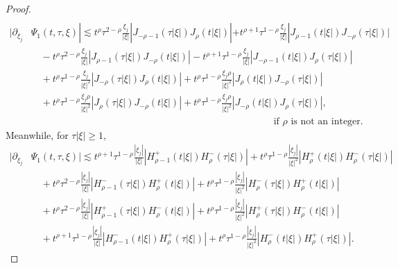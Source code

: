 \documentclass[11pt,twoside]{article}
\newcommand{\f}{\frac}
\theoremstyle{plain}
\theoremstyle{definition}
\theoremstyle{remark}
\numberwithin{equation}{section}
\begin{document}
\begin{proof}
\begin{equation}
\begin{aligned}
\end{aligned}
\end{equation}
\begin{equation}\label{l18}
\begin{aligned}
|\partial_{\xi_j}&\Psi_1(t, \tau, \xi)|
\lesssim t^\rho \tau^{2-\rho}\frac{\xi_j}{|\xi|} |J_{-\rho-1}(\tau|\xi|) J_\rho(t|\xi|)|+t^{\rho+1} \tau^{1-\rho}\frac{\xi_j}{|\xi|} |J_{\rho-1}(t|\xi|) J_{-\rho}(\tau|\xi|)| \\
&\quad -t^\rho \tau^{2-\rho}\frac{\xi_j}{|\xi|} |J_{\rho-1}(\tau|\xi|) J_{-\rho}(t|\xi|)|
-t^{\rho+1} \tau^{1-\rho}\frac{\xi_j}{|\xi|} |J_{-\rho-1}(t|\xi|) J_\rho(\tau|\xi|)|\\
& \quad+t^\rho \tau^{1-\rho}\frac{\xi_j}{|\xi|^2} |J_{-\rho}(\tau|\xi|) J_\rho(t|\xi|)| +t^\rho \tau^{1-\rho}\frac{\xi_j\rho}{|\xi|^2} |J_\rho(t|\xi|) J_{-\rho}(\tau|\xi|)|\\
&\quad +t^\rho \tau^{1-\rho}\frac{\xi_j\rho}{|\xi|^2} |J_\rho(\tau|\xi|) J_{-\rho}(t|\xi|)|+t^\rho \tau^{1-\rho}\frac{\xi_j\rho}{|\xi|^2} |J_{-\rho}(t|\xi|) J_\rho(\tau|\xi|)|,\\&\qquad\qquad\qquad\qquad\qquad\qquad\qquad\qquad\qquad\qquad\qquad\qquad\quad\text{if $\rho$ is not an integer.}
\end{aligned}
\end{equation}
Meanwhile, for $\tau|\xi|\geq 1$,
\begin{equation}\label{l19}
\begin{aligned}
|\partial_{\xi_j}&\Psi_1(t, \tau, \xi)|
\lesssim  t^{\rho+1}\tau^{1-\rho} \f{|\xi_j|}{|\xi|} \left| H_{\rho-1}^+(t|\xi|) H_{\rho}^-(\tau|\xi|) \right|
+ t^\rho\tau^{1-\rho} \frac{|\xi_j|}{|\xi|^2} \left| H_\rho^+(t|\xi|) H_{\rho}^-(\tau|\xi|) \right| \\
&\quad + t^\rho\tau^{2-\rho} \f{|\xi_j|}{|\xi|} \left| H_{\rho-1}^-(\tau|\xi|) H_\rho^+(t|\xi|) \right|
+ t^\rho\tau^{1-\rho} \frac{|\xi_j|}{|\xi|^2} \left| H_{\rho}^-(\tau|\xi|) H_\rho^+(t|\xi|) \right| \\
&\quad + t^\rho\tau^{2-\rho} \f{|\xi_j|}{|\xi|} \left| H_{\rho-1}^+(\tau|\xi|) H_\rho^-(t|\xi|) \right|
+ t^\rho\tau^{1-\rho} \frac{|\xi_j|}{|\xi|^2} \left| H_{\rho}^+(\tau|\xi|) H_\rho^-(t|\xi|) \right| \\
&\quad + t^{\rho+1}\tau^{1-\rho} \f{|\xi_j|}{|\xi|} \left| H_{\rho-1}^-(t|\xi|) H_{\rho}^+(\tau|\xi|) \right|
+ t^\rho\tau^{1-\rho} \frac{|\xi_j|}{|\xi|^2} \left| H_\rho^-(t|\xi|) H_{\rho}^+(\tau|\xi|) \right|.
\end{aligned}
\end{equation}

\end{proof}
\end{document}
